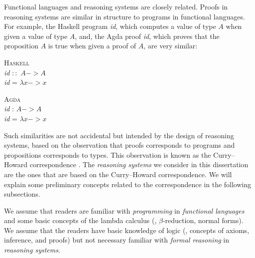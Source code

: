 Functional languages and reasoning systems are closely related.
Proofs in reasoning systems are similar in structure to programs
in functional languages. For example, the Haskell program \textit{id},
which computes a value of type $A$ when given a value of type $A$,
and, the Agda proof \textit{id}, which proves that the proposition $A$
is true when given a proof of $A$, are very similar:
\begin{center}
\begin{singlespace}
\begin{minipage}{.4\linewidth}
        \textsc{Haskell} \vspace*{.5em} \\
\textit{id} $::$ $A -> A$ \\
\textit{id} = $\lambda x -> x$
\end{minipage}
\begin{minipage}{.4\linewidth}
        \textsc{Agda}  \vspace*{.5em} \\
\textit{id} : $A -> A$ \\
\textit{id} = $\lambda x -> x$
\end{minipage}
\end{singlespace}
\end{center}\vspace*{.5em}
Such similarities are not accidental but intended by the design of
reasoning systems, based on the observation that proofs corresponds
to programs and propositions corresponds to types. This observation
is known as the Curry--Howard correspondence \cite{Howard69}.
The \emph{reasoning systems} we consider in this dissertation
are the ones that are based on the Curry--Howard correspondence.
We will explain some preliminary concepts related to the correspondence
in the following subsections.

We assume that readers are familiar with \emph{programming}
in \emph{functional languages} and some basic concepts of the lambda calculus
(\eg, $\beta$-reduction, normal forms). We assume that the readers have
basic knowledge of logic (\eg, concepts of axioms, inference, and proofs)
but not necessary familiar with \emph{formal reasoning}
in \emph{reasoning systems}.

